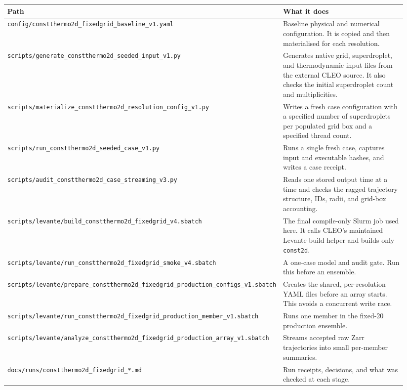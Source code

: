 \documentclass[11pt,a4paper]{article}
\begin{document}
\begin{longtable}{@{}p{0.42\linewidth}p{0.52\linewidth}@{}}
\toprule
Path & What it does \\
\midrule
\endhead
\texttt{config/constthermo2d\_fixedgrid\_baseline\_v1.yaml} & Baseline physical and numerical configuration. It is copied and then materialised for each resolution. \\
\texttt{scripts/generate\_constthermo2d\_seeded\_input\_v1.py} & Generates native grid, superdroplet, and thermodynamic input files from the external CLEO source. It also checks the initial superdroplet count and multiplicities. \\
\texttt{scripts/materialize\_constthermo2d\_resolution\_config\_v1.py} & Writes a fresh case configuration with a specified number of superdroplets per populated grid box and a specified thread count. \\
\texttt{scripts/run\_constthermo2d\_seeded\_case\_v1.py} & Runs a single fresh case, captures input and executable hashes, and writes a case receipt. \\
\texttt{scripts/audit\_constthermo2d\_case\_streaming\_v3.py} & Reads one stored output time at a time and checks the ragged trajectory structure, IDs, radii, and grid-box accounting. \\
\texttt{scripts/levante/build\_constthermo2d\_fixedgrid\_v4.sbatch} & The final compile-only Slurm job used here. It calls CLEO's maintained Levante build helper and builds only \texttt{const2d}. \\
\texttt{scripts/levante/run\_constthermo2d\_fixedgrid\_smoke\_v4.sbatch} & A one-case model and audit gate. Run this before an ensemble. \\
\texttt{scripts/levante/prepare\_constthermo2d\_fixedgrid\_production\_configs\_v1.sbatch} & Creates the shared, per-resolution YAML files before an array starts. This avoids a concurrent write race. \\
\texttt{scripts/levante/run\_constthermo2d\_fixedgrid\_production\_member\_v1.sbatch} & Runs one member in the fixed-20 production ensemble. \\
\texttt{scripts/levante/analyze\_constthermo2d\_fixedgrid\_production\_array\_v1.sbatch} & Streams accepted raw Zarr trajectories into small per-member summaries. \\
\texttt{docs/runs/constthermo2d\_fixedgrid\_*.md} & Run receipts, decisions, and what was checked at each stage. \\
\bottomrule
\end{longtable}
\end{document}
